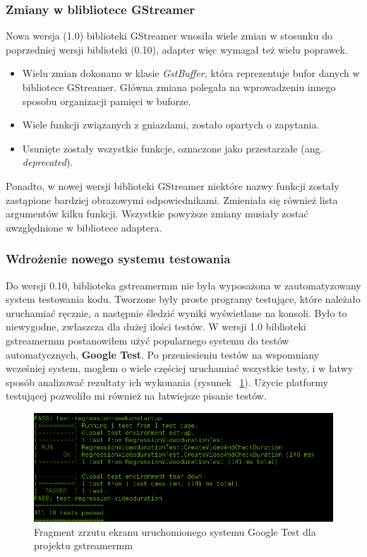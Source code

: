 \documentclass[12pt]{article}
\begin{document}
\subsubsection{Zmiany w blibliotece GStreamer}
Nowa wersja (1.0) biblioteki GStreamer wnosiła wiele zmian w stosunku do poprzedniej wersji biblioteki (0.10), adapter więc wymagał też wielu poprawek. 
\begin{itemize}
 \setlength{\itemsep}{0em}
  \item Wielu zmian dokonano w klasie \textit{GstBuffer}, która reprezentuje bufor danych w bibliotece GStreamer. Główna zmiana polegała na wprowadzeniu innego sposobu organizacji pamięci w buforze.
  \item Wiele funkcji związanych z gniazdami, zostało opartych o zapytania.
  \item Usunięte zostały wszystkie funkcje, oznaczone jako przestarzałe (ang. \textit{deprecated}).
\end{itemize}
Ponadto, w nowej wersji biblioteki GStreamer niektóre nazwy funkcji zostały zastąpione bardziej obrazowymi odpowiednikami. Zmieniała się również lista argumentów kilku funkcji.
Wszystkie powyższe zmiany musiały zostać uwzględnione w bibliotece adaptera.
\subsubsection{Wdrożenie nowego systemu testowania}
Do wersji 0.10, biblioteka gstreamermm nie była wyposażona w zautomatyzowany system testowania kodu. Tworzone były proste programy testujące, które należało uruchamiać ręcznie, a następnie śledzić wyniki wyświetlane na konsoli. Było to niewygodne, zwłaszcza dla dużej ilości testów. W wersji 1.0 biblioteki gstreamermm postanowiłem użyć popularnego systemu do testów automatycznych, \textbf{Google Test}. Po przeniesieniu testów na wspomniany wcześniej system, mogłem o wiele częściej uruchamiać wszystkie testy, i w łatwy sposób analizować rezultaty ich wykonania (rysunek ~\ref{fig:gtestScreen}). Użycie platformy testującej pozwoliło mi również na łatwiejsze pisanie testów.
\begin{figure}[H]
  \includegraphics[width=150mm]{img/gtest-screen.png}
  \caption{Fragment zrzutu ekranu uruchomionego systemu Google Test dla projektu gstreamermm}
  \label{fig:gtestScreen}
\end{figure}
\end{document}
